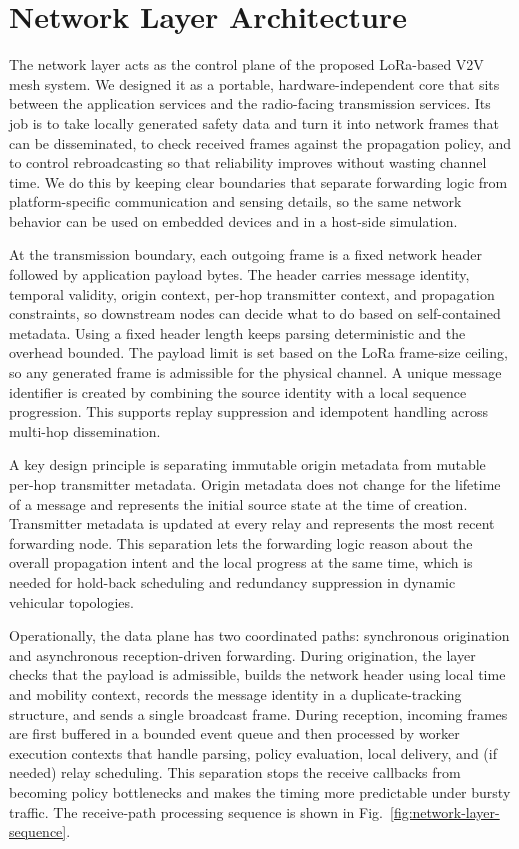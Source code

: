\section{Network Layer Architecture}

The network layer acts as the control plane of the proposed LoRa-based V2V mesh system. We designed it as a
portable, hardware-independent core that sits between the application services and the radio-facing
transmission services. Its job is to take locally generated safety data and turn it into network frames that
can be disseminated, to check received frames against the propagation policy, and to control rebroadcasting so
that reliability improves without wasting channel time. We do this by keeping clear boundaries that separate
forwarding logic from platform-specific communication and sensing details, so the same network behavior can be
used on embedded devices and in a host-side simulation.

At the transmission boundary, each outgoing frame is a fixed network header followed by application payload
bytes. The header carries message identity, temporal validity, origin context, per-hop transmitter context, and
propagation constraints, so downstream nodes can decide what to do based on self-contained metadata. Using a
fixed header length keeps parsing deterministic and the overhead bounded. The payload limit is set based on the
LoRa frame-size ceiling, so any generated frame is admissible for the physical channel. A unique message
identifier is created by combining the source identity with a local sequence progression. This supports replay
suppression and idempotent handling across multi-hop dissemination.

A key design principle is separating immutable origin metadata from mutable per-hop transmitter metadata.
Origin metadata does not change for the lifetime of a message and represents the initial source state at the
time of creation. Transmitter metadata is updated at every relay and represents the most recent forwarding
node. This separation lets the forwarding logic reason about the overall propagation intent and the local
progress at the same time, which is needed for hold-back scheduling and redundancy suppression in dynamic
vehicular topologies.

Operationally, the data plane has two coordinated paths: synchronous origination and asynchronous
reception-driven forwarding. During origination, the layer checks that the payload is admissible, builds the
network header using local time and mobility context, records the message identity in a duplicate-tracking
structure, and sends a single broadcast frame. During reception, incoming frames are first buffered in a
bounded event queue and then processed by worker execution contexts that handle parsing, policy evaluation,
local delivery, and (if needed) relay scheduling. This separation stops the receive callbacks from becoming
policy bottlenecks and makes the timing more predictable under bursty traffic. The receive-path processing
sequence is shown in Fig.~\ref{fig:network-layer-sequence}.

